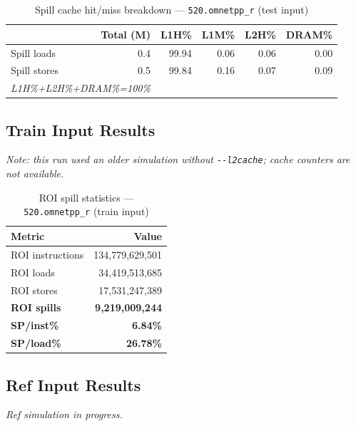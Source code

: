 \documentclass[11pt,a4paper]{article}
\begin{document}
\begin{table}[H]
\centering
\caption{Spill cache hit/miss breakdown --- \texttt{520.omnetpp\_r} (test input)}
\label{tab:omnetpp_test_cache}
\begin{tabular}{lrrrrr}
\toprule
\textbf{} & \textbf{Total (M)} & \textbf{L1H\%} & \textbf{L1M\%} & \textbf{L2H\%} & \textbf{DRAM\%} \\
\midrule
Spill loads  & 0.4 & 99.94 & 0.06 & 0.06 & 0.00 \\
Spill stores & 0.5 & 99.84 & 0.16 & 0.07 & 0.09 \\
\multicolumn{2}{l}{\small\textit{L1H\%+L2H\%+DRAM\%=100\%}} \\
\bottomrule
\end{tabular}
\end{table}

\subsection{Train Input Results}

\textit{Note: this run used an older simulation without \texttt{-{}-l2cache}; cache counters are not available.}


\begin{table}[H]
\centering
\caption{ROI spill statistics --- \texttt{520.omnetpp\_r} (train input)}
\label{tab:omnetpp_train_roi}
\begin{tabular}{lr}
\toprule
\textbf{Metric} & \textbf{Value} \\
\midrule
ROI instructions & 134,779,629,501 \\
ROI loads        & 34,419,513,685 \\
ROI stores       & 17,531,247,389 \\
\textbf{ROI spills}   & \textbf{9,219,009,244} \\
\textbf{SP/inst\%}   & \textbf{6.84\%} \\
\textbf{SP/load\%}   & \textbf{26.78\%} \\
\bottomrule
\end{tabular}
\end{table}

\subsection{Ref Input Results}
\textit{Ref simulation in progress.}



\end{document}
